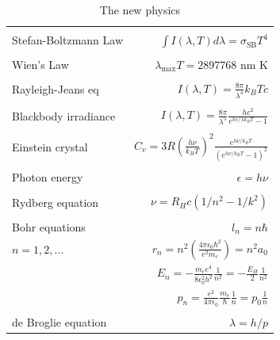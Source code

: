 \message{ !name(Outline.tex)}\documentclass[11pt]{article}
\begin{document}
\begin{outline}
\begin{table} 
\begin{center}
    \caption{The new physics}
    \begin{tabular}{|lr|}
     \hline
 & \\
Stefan-Boltzmann Law & $\displaystyle  \int I(\lambda,T)d\lambda = \sigma_\mathrm{SB} T^4$
\\ & \\
Wien's Law & $\displaystyle \lambda_\mathrm{max}T=2897768$ nm K \\
 & \\
Rayleigh-Jeans eq& $\displaystyle I(\lambda,T) = \frac{8\pi}{\lambda^4} k_B T c $ \\ 
& \\
Blackbody irradiance & $\displaystyle I(\lambda, T) =
\frac{8\pi}{\lambda^5}\frac{hc^2}{e^{hc/\lambda k_B T}-1}$ \\ 
& \\
Einstein crystal & $\displaystyle C_v=3R \left(\frac{h\nu}{k_BT}\right )^2\frac{e^{h\nu/k_BT}}{\left
            ( e^{h\nu/k_BT}-1 \right )^2}$ \\
& \\
Photon energy & $\displaystyle \epsilon=h\nu $ \\
& \\
Rydberg equation & $\displaystyle \nu = R_H c\left (1/n^2
        -1/k^2 \right)$ \\
& \\
Bohr equations & $\displaystyle l_n=n \hbar$ \\
$\displaystyle n=1,2, \ldots $ & $\displaystyle r_n = n^2 \left ( \frac{4 \pi
    \epsilon_0 \hbar^2}{e^2 m_e} \right ) = n^2 a_0$ \\
 & $\displaystyle E_n =-\frac{m_e e^4}{8\epsilon_0^2
   h^2}\frac{1}{n^2}=-\frac{E_H}{2}\frac{1}{n^2}$ \\ 
 & $\displaystyle p_n =\frac{e^2}{4\pi\epsilon_0}\frac{m_e}{\hbar}\frac{1}{n} =
p_0 \frac{1}{n} $ \\
& \\
de Broglie equation & $\displaystyle \lambda=h/p $ \\
\hline
\end{tabular}
\end{center}
\end{table}


\end{outline}
\end{document}
